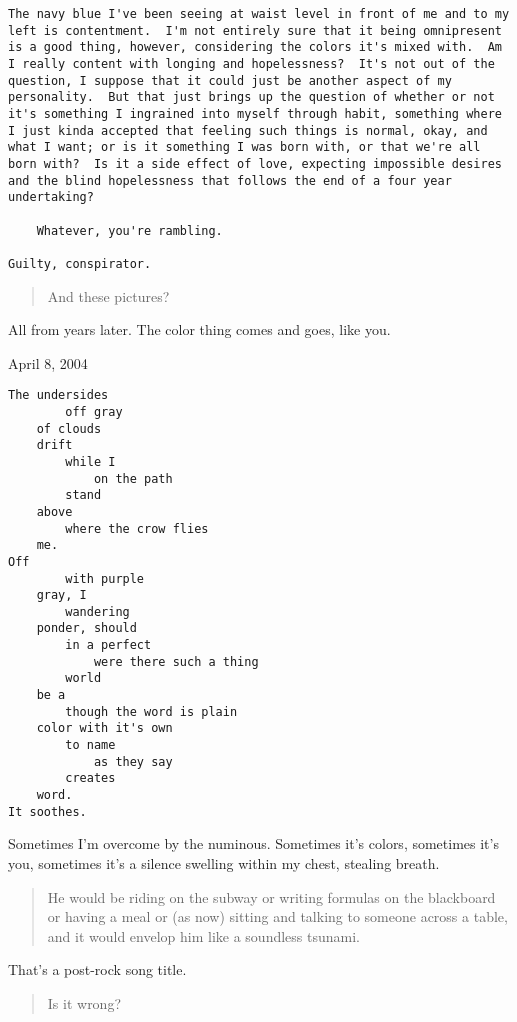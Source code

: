 \begin{verbatim}
The navy blue I've been seeing at waist level in front of me and to my left is contentment.  I'm not entirely sure that it being omnipresent is a good thing, however, considering the colors it's mixed with.  Am I really content with longing and hopelessness?  It's not out of the question, I suppose that it could just be another aspect of my personality.  But that just brings up the question of whether or not it's something I ingrained into myself through habit, something where I just kinda accepted that feeling such things is normal, okay, and what I want; or is it something I was born with, or that we're all born with?  Is it a side effect of love, expecting impossible desires and the blind hopelessness that follows the end of a four year undertaking?

    Whatever, you're rambling.

Guilty, conspirator.
\end{verbatim}

\begin{quote}
And these pictures?
\end{quote}

All from years later. The color thing comes and goes, like you.

April 8, 2004

\begin{verbatim}
The undersides
        off gray
    of clouds
    drift
        while I
            on the path
        stand
    above
        where the crow flies
    me.
Off
        with purple
    gray, I
        wandering
    ponder, should
        in a perfect
            were there such a thing
        world
    be a
        though the word is plain
    color with it's own
        to name
            as they say
        creates
    word.
It soothes.
\end{verbatim}

Sometimes I'm overcome by the numinous. Sometimes it's colors, sometimes it's you, sometimes it's a silence swelling within my chest, stealing breath.

\begin{quote}
He would be riding on the subway or writing formulas on the blackboard or having a meal or (as now) sitting and talking to someone across a table, and it would envelop him like a soundless tsunami.
\end{quote}

That's a post-rock song title.

\begin{quote}
Is it wrong?
\end{quote}

